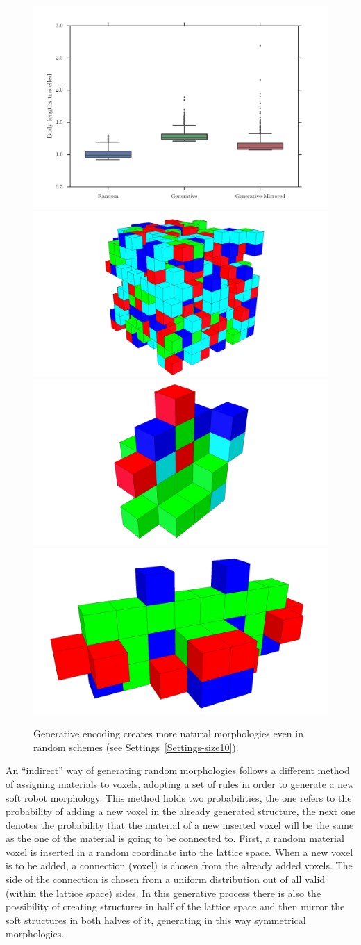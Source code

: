\begin{figure}
\centering
\includegraphics[width=1.0\textwidth]{../Figures/Results/random.pdf}\\
\hspace{0.1cm}
\includegraphics[height=0.15\textwidth]{../Figures/Robots/random.jpg}
\includegraphics[height=0.15\textwidth]{../Figures/Robots/rg0.jpg}
\includegraphics[height=0.15\textwidth]{../Figures/Robots/rg1.jpg}
\caption{Generative encoding creates more natural morphologies even in random schemes (see Settings~\ref{Settings-size10}).}
\label{fig:randomResultsRobots}
\end{figure}

An ``indirect'' way of generating random morphologies follows a different method of assigning materials to voxels, adopting a set of rules in order to generate a new soft robot morphology. This method holds two probabilities, the one refers to the probability of adding a new voxel in the already generated structure, the next one denotes the probability that the material of a new inserted voxel will be the same as the one of the material is going to be connected to. First, a random material voxel is inserted in a random coordinate into the lattice space. When a new voxel is to be added, a connection (voxel) is chosen from the already added voxels. The side of the connection is chosen from a uniform distribution out of all valid (within the lattice space) sides. In this generative process there is also the possibility of creating structures in half of the lattice space and then mirror the soft structures in both halves of it, generating in this way symmetrical morphologies.

